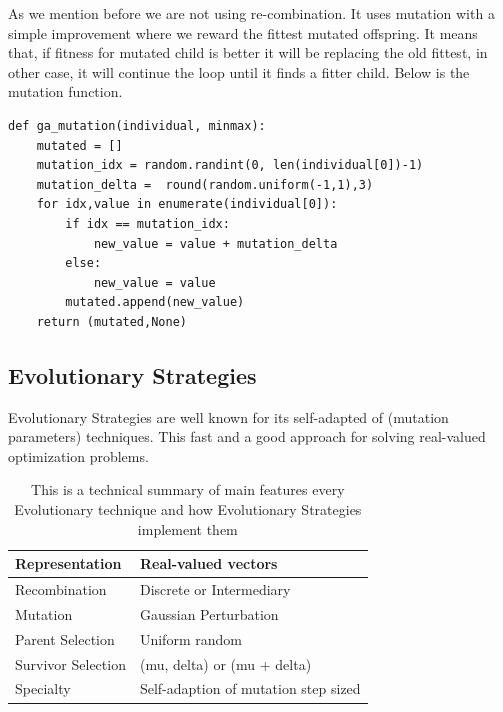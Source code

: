 \documentclass[]{spie}  %
\begin{document}
As we mention before we are not using re-combination. It uses mutation with a simple improvement where we reward the fittest mutated offspring. It means that, if fitness for mutated child is better it will be replacing the old fittest, in other case, it will continue the loop until it finds a fitter child. Below is the mutation function.
\\
\begin{lstlisting}[frame=single]  % Start your code-block 
def ga_mutation(individual, minmax):
    mutated = []
    mutation_idx = random.randint(0, len(individual[0])-1)
    mutation_delta =  round(random.uniform(-1,1),3)
    for idx,value in enumerate(individual[0]):
        if idx == mutation_idx:
            new_value = value + mutation_delta
        else:
            new_value = value
        mutated.append(new_value)
    return (mutated,None)
\end{lstlisting}

\subsection{Evolutionary Strategies}
Evolutionary Strategies are well known for its self-adapted of (mutation parameters) techniques. This fast and a good approach for solving real-valued optimization problems.

\begin{table}[ht]
\caption{ This is a technical summary of main features every Evolutionary technique and how Evolutionary Strategies implement them} 
\label{tab:fonts}
\begin{center}       
\begin{tabular}{|l|l|}
\hline
\rule[-1ex]{0pt}{3.5ex}  Representation & Real-valued vectors \\
\hline
\rule[-1ex]{0pt}{3.5ex}  Recombination & Discrete or Intermediary   \\
\hline
\rule[-1ex]{0pt}{3.5ex}  Mutation & Gaussian Perturbation   \\
\hline
\rule[-1ex]{0pt}{3.5ex}  Parent Selection & Uniform random   \\
\hline
\rule[-1ex]{0pt}{3.5ex}  Survivor Selection & (mu, delta) or (mu + delta)  \\
\hline
\rule[-1ex]{0pt}{3.5ex}  Specialty & Self-adaption of mutation step sized  \\
\hline
\end{tabular}
\end{center}
\end{table} 
\end{document}
